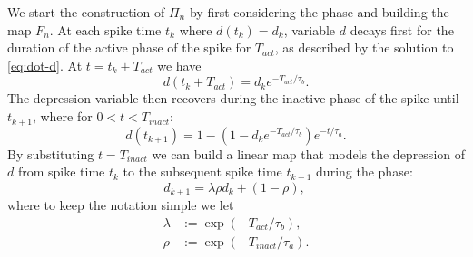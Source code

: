 We start the construction of \(\Pi_n\) by first considering the \free{} phase and building the map \(F_n\).
At each spike time \(t_{k}\) where \(d(t_k) = d_k\), variable \(d\) decays first for the duration of the active phase of the spike for \(T_{act}\), as described by the solution to \cref{eq:dot-d}.
At \(t = t_k + T_{act}\) we have
\begin{equation}
	d(t_k + T_{act}) = d_k e^{-T_{act}/\tau_b}.
\end{equation}
The depression variable then recovers during the inactive phase of the spike until \(t_{k+1}\), where for \(0<t<T_{inact}\):
\begin{equation}
	d(t_{k+1}) = 1 - (1 - d_k e^{-T_{act}/\tau_b} )e^{-t/\tau_a}.
\end{equation}
By substituting \(t=T_{inact}\) we can build a linear map that models the depression of \(d\) from spike time \(t_{k}\) to the subsequent spike time \(t_{k+1}\) during the \free{} phase:
\begin{equation}
	d_{k+1} = \lambda\rho d_{k} + (1-\rho),~\label{eq:map-d}
\end{equation}
where to keep the notation simple we let
\begin{align}
	\lambda & := \exp(-T_{act}/\tau_b), \label{eq:lambda} \\
	\rho    & :=\exp(-T_{inact}/\tau_{a}). \label{eq:rho}
\end{align}


